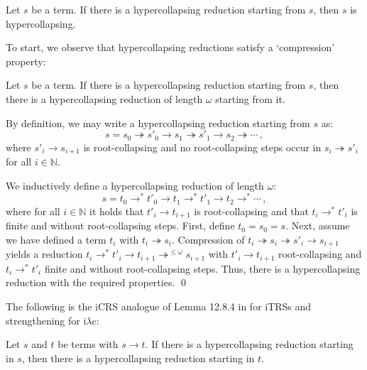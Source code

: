 \documentclass{LMCS}
\theoremstyle{plain}
\theoremstyle{definition}
\newcommand{\rew}{\rightarrow}
\newcommand{\rewt}{\rightarrow^*}
\newcommand{\trewt}{\twoheadrightarrow}
\newcommand{\trewtp}[1]{\twoheadrightarrow^{#1}}
\newcommand{\natnum}{\mathbb{N}}
\newcommand{\iLC}{i$\lambda$c\xspace}
\begin{document}
\begin{lem}
\label{lem:HCR->HC}
Let $s$ be a term. If there is a hypercollapsing reduction starting from $s$, 
then $s$ is hypercollapsing.
\end{lem}

To start, we observe that 
hypercollapsing reductions satisfy a `compression' property:
\begin{lem}
\label{lem:hycomp}
Let $s$ be a term. If there is a hypercollapsing reduction 
starting from $s$, then there is a hypercollapsing reduction of length
$\omega$ starting from it.
\end{lem}

\proof
By definition, we may write a hypercollapsing reduction starting from $s$ as:
\[
s = s_0 \trewt s'_0 \rew s_1 \trewt s'_1 \rew s_2 \trewt \cdots  \, ,
\]
where $s'_i \rew s_{i + 1}$ is
root-collapsing and no root-collapsing steps occur in
$s_i \trewt s'_i$ for all $i \in \natnum$.

We inductively define a hypercollapsing reduction of length $\omega$:
\[
s = t_0 \rewt t'_0 \rew t_1 \rewt t'_1 \rew t_2 \rewt \cdots  \, ,
\]
where for all $i \in \natnum$ it holds that $t'_i \rew t_{i + 1}$ is root-collapsing and that $t_i \rewt t'_i$ is finite and without root-collapsing steps. First, define $t_0 = s_0 = s$. Next, assume we have defined a term $t_i$ with $t_i \trewt s_i$. Compression of $t_i \trewt s_i \trewt s'_i \rew s_{i + 1}$ yields a reduction $t_i \rewt t'_i \rew t_{i + 1} \trewtp{\leq \omega} s_{i + 1}$ with $t'_i \rew t_{i + 1}$ root-collapsing and $t_i \rewt t'_i$ finite and without root-collapsing steps. Thus, there is a hypercollapsing reduction with the required properties. \qed

The following is the iCRS analogue of Lemma 12.8.4 in \cite{T03_KV} for
iTRSs and strengthening for \iLC:
\begin{lem}
\label{lem:HCR_is_preserved}
Let $s$ and $t$ be terms with $s \rew t$.
If there is a hypercollapsing reduction starting in $s$, then there is a hypercollapsing reduction starting in $t$.
\end{lem}
\end{document}
